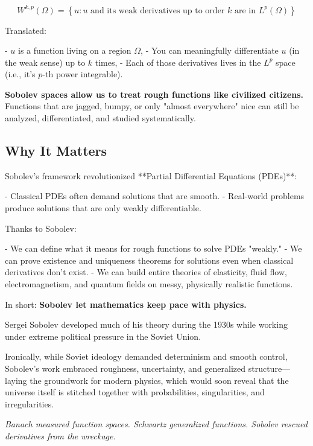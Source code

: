 \[
W^{k,p}(\Omega) = \left\{ u : u \text{ and its weak derivatives up to order } k \text{ are in } L^p(\Omega) \right\}
\]

Translated:

- \( u \) is a function living on a region \( \Omega \),
- You can meaningfully differentiate \( u \) (in the weak sense) up to \( k \) times,
- Each of those derivatives lives in the \( L^p \) space (i.e., it’s \( p \)-th power integrable).

\smallskip

\textbf{Sobolev spaces allow us to treat rough functions like civilized citizens.}  
Functions that are jagged, bumpy, or only "almost everywhere" nice can still be analyzed, differentiated, and studied systematically.

\subsection*{Why It Matters}

Sobolev’s framework revolutionized **Partial Differential Equations (PDEs)**:

- Classical PDEs often demand solutions that are smooth.
- Real-world problems produce solutions that are only weakly differentiable.

Thanks to Sobolev:

- We can define what it means for rough functions to solve PDEs "weakly."
- We can prove existence and uniqueness theorems for solutions even when classical derivatives don't exist.
- We can build entire theories of elasticity, fluid flow, electromagnetism, and quantum fields on messy, physically realistic functions.

\medskip

In short:  
\textbf{Sobolev let mathematics keep pace with physics.}

\begin{tcolorbox}[title=Historical Sidebar: Mathematics Under Siege, colback=gray!5!white, colframe=black!80!white, fonttitle=\bfseries]

  Sergei Sobolev developed much of his theory during the 1930s while working under extreme political pressure in the Soviet Union.

  Ironically, while Soviet ideology demanded determinism and smooth control, Sobolev's work embraced roughness, uncertainty, and generalized structure—laying the groundwork for modern physics, which would soon reveal that the universe itself is stitched together with probabilities, singularities, and irregularities.

\end{tcolorbox}

\vspace{1em}

\begin{center}
\textit{Banach measured function spaces.  
Schwartz generalized functions.  
Sobolev rescued derivatives from the wreckage.}
\end{center}
